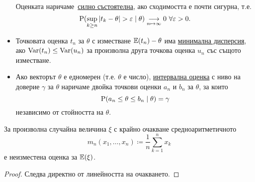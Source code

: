 \documentclass[numbers=endperiod, DIV=15, bibliography=totocnumbered]{scrartcl}
\begin{document}
\begin{definition}[Оценки]
\begin{itemize}
    Оценката наричаме~\uline{силно състоятелна}, ако сходимостта е почти сигурна, т.е.
    \begin{displaymath}
      \operatorname{P}(\sup_{k \geq n} \left\vert t_k - \theta \right\vert > \varepsilon \mid \theta) \underset {n \mapsto \infty} \longrightarrow 0~\forall \varepsilon > 0.
    \end{displaymath}

    \item Точковата оценка $t_n$ за $\theta$ с изместване $\mathbb{E}(t_n) - \theta$ има \uline{минимална дисперсия}, ако $\operatorname{Var}(t_n) \leq \operatorname{Var}(u_n)$ за произволна друга точкова оценка $u_n$ със същото изместване.

    \item Ако векторът $\theta$ е едномерен (т.е. $\theta$ е число), \uline{интервална оценка} с ниво на доверие $\gamma$ за $\theta$ наричаме двойка точкови оценки $a_n$ и $b_n$ за $\theta$, за които
    \begin{displaymath}
      \operatorname{P}(a_n \leq \theta \leq b_n \mid \theta) = \gamma
    \end{displaymath}
    независимо от стойността на $\theta$.
  \end{itemize}
\end{definition}

\begin{proposition}\label{thm:unbiased-mean}
  За произволна случайна величина $\xi$ с крайно очакване средноаритметичното
  \begin{displaymath}
    m_n(x_1, \ldots, x_n) \coloneqq \frac 1 n \sum_{k=1}^n x_k
  \end{displaymath}
  е неизместена оценка за $\mathbb{E}(\xi)$.
\end{proposition}
\begin{proof}
  Следва директно от линейността на очакването.
\end{proof}
\end{document}
